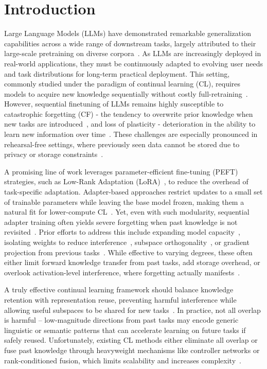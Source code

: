 \documentclass[11pt]{article}
\begin{document}
\section{Introduction}
Large Language Models (LLMs) have demonstrated remarkable generalization capabilities across a wide range of downstream tasks, largely attributed to their large-scale pretraining on diverse corpora~\cite{brown2020language, touvron2023llama,achiam2023gpt}. As LLMs are increasingly deployed in real-world applications, they must be continuously adapted to evolving user needs and task distributions for long-term practical deployment. This setting, commonly studied under the paradigm of continual learning (CL), requires models to acquire new knowledge sequentially without costly full-retraining~\cite{ruvolo2013ella}. However, sequential finetuning of LLMs remains highly susceptible to catastrophic forgetting (CF) - the tendency to overwrite prior knowledge when new tasks are introduced~\cite{mccloskey1989catastrophic}, and loss of plasticity - deterioration in the ability to learn new information over time~\cite{dohare2021continual}. These challenges are especially pronounced in rehearsal-free settings, where previously seen data cannot be stored due to privacy or storage constraints~\cite{chaudhry2019continual}.

A promising line of work leverages parameter-efficient fine-tuning (PEFT) strategies, such as Low-Rank Adaptation (LoRA)~\cite{hu2022lora}, to reduce the overhead of task-specific adaptation. Adapter-based approaches restrict updates to a small set of trainable parameters while leaving the base model frozen, making them a natural fit for lower-compute CL~\cite{qin2021lfpt5, song2023conpet}. Yet, even with such modularity, sequential adapter training often yields severe forgetting when past knowledge is not revisited~\cite{wang2024inscl}. Prior efforts to address this include expanding model capacity~\cite{wang2024rehearsal}, isolating weights to reduce interference~\cite{aljundi2017expert, li2019learn, wang2023rehearsal}, subspace orthogonality~\cite{wang2023orthogonal, liao2025data}, or gradient projection from previous tasks~\cite{qiao2024learn}. While effective to varying degrees, these often either limit forward knowledge transfer from past tasks, add storage overhead, or overlook activation-level interference, where forgetting actually manifests~\cite{ke2021achieving}.

A truly effective continual learning framework should balance knowledge retention with representation reuse, preventing harmful interference while allowing useful subspaces to be shared for new tasks~\cite{wu2024continual}. In practice, not all overlap is harmful -- low-magnitude directions from past tasks may encode generic linguistic or semantic patterns that can accelerate learning on future tasks if safely reused. Unfortunately, existing CL methods either eliminate all overlap or fuse past knowledge through heavyweight mechanisms like controller networks or rank-conditioned fusion, which limits scalability and increases complexity~\cite{zhao2024sapt, liu2023vida, liao2025data}.
\end{document}

